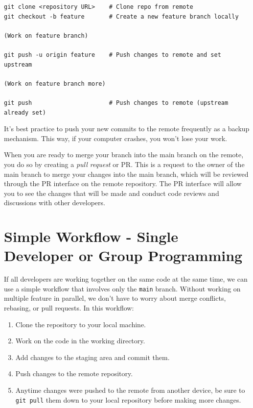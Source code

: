 \documentclass[fleqn]{article}
\begin{document}
\begin{lstlisting}
git clone <repository URL>    # Clone repo from remote
git checkout -b feature       # Create a new feature branch locally

(Work on feature branch)

git push -u origin feature    # Push changes to remote and set upstream

(Work on feature branch more)

git push                      # Push changes to remote (upstream already set)
\end{lstlisting}

It's best practice to push your new commits to the remote frequently as a 
backup mechanism. This way, if your computer crashes, you won't lose your work.

When you are ready to merge your branch into the main branch on the remote, you
do so by creating a \emph{pull request} or PR. This is a request to the owner
of the main branch to merge your changes into the main branch, which will be
reviewed through the PR interface on the remote repository. The PR interface
will allow you to see the changes that will be made and conduct code reviews and
discussions with other developers.

\pagebreak

\section*{Simple Workflow - Single Developer or Group Programming}

If all developers are working together on the same code at the same time, we can
use a simple workflow that involves only the \texttt{main} branch. Without
working on multiple feature in parallel, we don't have to worry about merge
conflicts, rebasing, or pull requests. In this workflow:

\begin{enumerate}
    \item Clone the repository to your local machine.
    \item Work on the code in the working directory.
    \item Add changes to the staging area and commit them.
    \item Push changes to the remote repository.
    \item Anytime changes were pushed to the remote from another device, be sure
          to \texttt{git pull} them down to your local repository before making
          more changes.
\end{enumerate}
\end{document}
